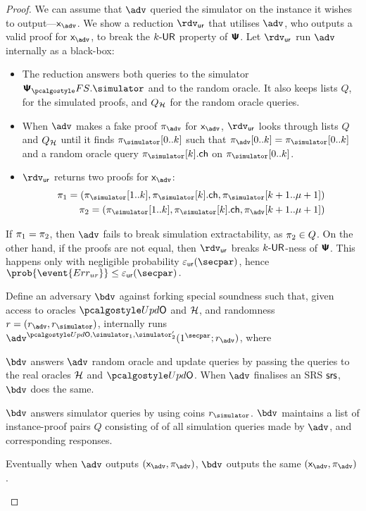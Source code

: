 \begin{proof}
{  We can assume that $\advse$ queried the simulator on the instance it wishes to
  output---$\inp_{\advse}$. We show a reduction $\rdvur$ that utilises $\advse$,
  who outputs a valid proof for $\inp_{\advse}$, to break the ${k\text{-}\mathsf{UR}}$ property of
  $\bm{\mathsf{\Psi}}$. Let $\rdvur$ run $\advse$ internally as a black-box:
\begin{itemize}
	\item The reduction answers both queries to the simulator $\psfs.\simulator$ and to the random oracle. 
	It also keeps lists $Q$, for the simulated proofs, and $Q_{\mathcal{H}}$ for the random oracle queries. 
\item When $\advse$ makes a fake proof $\zkproof_{\advse}$ for $\inp_{\advse}$,
  $\rdvur$ looks through lists $Q$ and $Q_{\mathcal{H}}$ until it finds
  $\zkproof_{\simulator}[0..k]$ such that
  $\zkproof_{\advse}[0..k] = \zkproof_{\simulator}[0..k]$
  and a random oracle query $\zkproof_{\simulator}[k].\ch$ on
  $\zkproof_{\simulator}[0..k]$.
	\item $\rdvur$ returns two proofs for $\inp_{\advse}$:
	\begin{align*}
		\zkproof_1 = (\zkproof_{\simulator}[1..k],
		\zkproof_{\simulator}[k].\ch, \zkproof_{\simulator}[k + 1..\mu + 1])\\
		\zkproof_2 = (\zkproof_{\simulator}[1..k],
		\zkproof_{\simulator}[k].\ch, \zkproof_{\advse}[k + 1..\mu + 1])
	\end{align*}
	\end{itemize}  
	If $\pi_1 = \pi_2$, then $\advse$ fails to break simulation
  extractability, as $\pi_2 \in Q$. On the other hand, if the proofs are
  not equal, then $\rdvur$ breaks ${k\text{-}\mathsf{UR}}$-ness of $\bm{\mathsf{\Psi}}$. This happens only with
  negligible probability $\epsur(\secpar)$, hence \( \prob{\event{\errur}} \leq
  \epsur(\secpar)\,. \)
}
%
 Define an adversary $\bdv$ against forking special soundness such that,
given access to oracles $\initU$ and $\mathcal{H}$, and randomness $r = (r_\adv, \rsim)$,
internally runs $\advse^{\initU, \simulator_1, \simulator_2'} (1^\secpar; r_\adv)$,
where
\begin{compactenum}
\item $\bdv$ answers $\adv$ random oracle and update queries by passing the queries to the real
  oracles $\mathcal{H}$ and $\initU$. When $\adv$ finalises an SRS $\mathsf{srs}$, $\bdv$ does the same.
\item $\bdv$ answers simulator queries by using coins $\rsim$. $\bdv$ maintains a
  list of instance-proof pairs $Q$ consisting of of all simulation queries made by
  $\adv$, and corresponding responses.
\item Eventually when $\adv$ outputs $(\inp_\advse, \zkproof_\advse)$, $\bdv$ outputs
  the same $(\inp_\advse, \zkproof_\advse)$.
\end{compactenum}


\end{proof}
